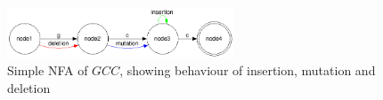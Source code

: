 \begin{figure}[h!]
  \centering
      \includegraphics[width=0.6\textwidth]{lib/gcc_ins_mut_del.png}
  \caption{Simple NFA of $GCC$, showing behaviour of insertion, mutation and deletion}
\label{fig:ins_mut_del}
\end{figure}


